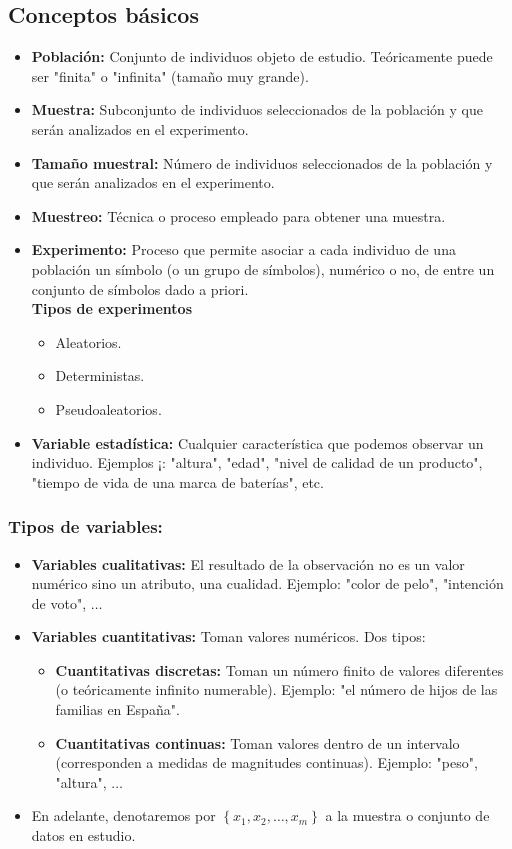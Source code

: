 \subsection{Conceptos básicos}
\begin{itemize}
	\item \textbf{Población:} Conjunto de individuos objeto de estudio. Teóricamente puede ser "finita" o "infinita" (tamaño muy grande).
	\item \textbf{Muestra:} Subconjunto de individuos seleccionados de la población y que serán analizados en el experimento.
	\item \textbf{Tamaño muestral:} Número de individuos seleccionados de la población y que serán analizados en el experimento.
	\item \textbf{Muestreo:} Técnica o proceso empleado para obtener una muestra.
	\item \textbf{Experimento:} Proceso que permite asociar a cada individuo de una población un símbolo (o un grupo de símbolos), numérico o no, de entre un conjunto de símbolos dado a priori.\\ \textbf{Tipos de experimentos}
	\begin{itemize}
		\item Aleatorios.
		\item Deterministas.
		\item Pseudoaleatorios.
	\end{itemize}
	\item \textbf{Variable estadística:} Cualquier característica que podemos observar un individuo. Ejemplos ¡: "altura", "edad", "nivel de calidad de un producto", "tiempo de vida de una marca de baterías", etc.
\end{itemize}
\subsubsection*{Tipos de variables:}
\begin{itemize}
	\item \textbf{Variables cualitativas:} El resultado de la observación no es un valor numérico sino un atributo, una cualidad. Ejemplo: "color de pelo", "intención de voto", $\hdots$
	\item \textbf{Variables cuantitativas:} Toman valores numéricos. Dos tipos:
	\begin{itemize}
		\item \textbf{Cuantitativas discretas:} Toman un número finito de valores diferentes (o teóricamente infinito numerable). Ejemplo: "el número de hijos de las familias en España".
		\item \textbf{Cuantitativas continuas:} Toman valores dentro de un intervalo (corresponden a medidas de magnitudes continuas). Ejemplo: "peso", "altura", $\hdots$
	\end{itemize}
	\item En adelante, denotaremos por $\left\lbrace x_{1}, x_{2}, \hdots, x_{m}\right\rbrace$ a la muestra o conjunto de datos en estudio.
\end{itemize}
